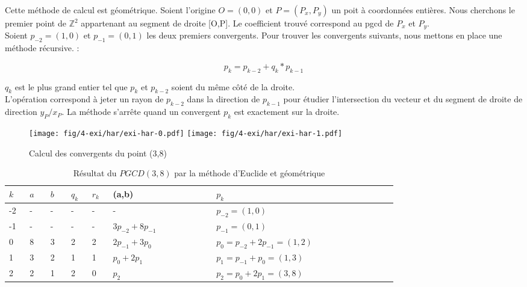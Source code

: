 Cette méthode de calcul est géométrique. Soient l’origine $O=(0,0)$ et $P = (P_x, P_y)$ un poit à coordonnées entières. Nous cherchons le premier point de $\mathbb{Z}^{2}$ appartenant au segment de droite [O,P]. Le coefficient trouvé correspond au pgcd de $P_x$ et $P_y$.\\

Soient $p_{-2} = (1,0)$ et $p_{-1} = (0,1)$ les deux premiers convergents. Pour trouver les convergents suivants, nous mettons en place une méthode récursive.  :

$$p_{k} = p_{k-2} + q_k * p_{k-1}$$

$q_k$ est le plus grand entier tel que $p_{k}$ et $p_{k-2}$ soient du même côté de la droite.\\

L'opération correspond à jeter un rayon de $p_{k-2}$ dans la direction de $p_{k-1}$ pour étudier l’intersection du vecteur et du segment de droite de direction $y_P / x_P$. La méthode s’arrête quand un convergent $p_{k}$ est exactement sur la droite.\\

\begin{figure}[H]
  \centering
  \texttt{[image: fig/4-exi/har/exi-har-0.pdf]}
  \texttt{[image: fig/4-exi/har/exi-har-1.pdf]}
  \caption{Calcul des convergents du point (3,8)}
\end{figure}


\begin{table}[H]
  \centering
  \begin{tabular}{|p{0.04\linewidth}|p{0.04\linewidth}|p{0.04\linewidth}||p{0.04\linewidth}|p{0.04\linewidth}||p{0.2\linewidth}||p{0.35\linewidth}|}
    \hline 
    $k$ & $a$ & $b$ & $q_{k}$ & $r_k$ & (a,b) & $p_k$ \\
    \hline 
    -2 & - & - & - & - & -                    & $p_{-2} = (1,0)$\\
    -1 & - & - & - & - & $3 p_{-2} + 8p_{-1}$ & $p_{-1} = (0,1)$\\
     0 & 8 & 3 & 2 & 2 & $2 p_{-1} + 3p_{0}$  & $p_{0}  = p_{-2} + 2p_{-1} = (1,2)$\\ 
     1 & 3 & 2 & 1 & 1 & $p_{0}  + 2p_{1}$    & $p_{1}  = p_{-1} + p_{0} = (1,3)$\\
     2 & 2 & 1 & 2 & 0 & $p_{2}$              & $p_{2}  = p_{0} + 2p_{1} = (3,8)$\\
    \hline
  \end{tabular} 
  \caption{Résultat du $PGCD(3,8)$ par la méthode d'Euclide et géométrique}
\end{table}


